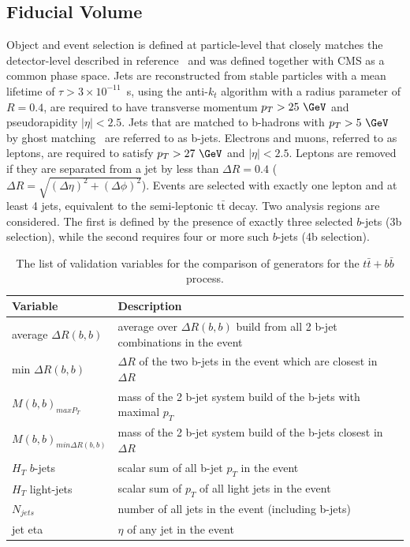 \subsection{Fiducial Volume}
Object and event selection is defined at particle-level that closely matches the detector-level described in reference~\cite{HIGG-2017-03} and was defined together with CMS as a common phase space. Jets are reconstructed from stable particles with a mean lifetime of $\tau > 3\times 10^{-11}$~s, using the anti-$k_t$ algorithm with a radius parameter of $R=0.4$, are required to have transverse momentum $p_{T}>25~\GeV$ and pseudorapidity $|\eta|< 2.5$. Jets that are matched to b-hadrons with $p_{T}>5~\GeV$ by ghost matching~\cite{Cacciari:2008gn} are referred to as b-jets. Electrons and muons, referred to as leptons, are required to satisfy $p_{T}>27~\GeV$ and $|\eta|< 2.5$. 
Leptons are removed if they are separated from a jet by less than $\Delta R=0.4$ ($\Delta R = \sqrt{(\Delta \eta )^2 + (\Delta \phi)^2}$).
Events are selected with exactly one lepton and at least 4 jets, equivalent to the semi-leptonic $\mathrm{t\bar{t}}$ decay.
Two analysis regions are considered. The first is defined by the presence of exactly three selected $b$-jets (3b selection), while the second requires four or more such $b$-jets (4b selection).


\begin{table}[]
\begin{center}
\caption{\label{tab:ttbb_varlist}
The list of validation variables for the comparison of generators for the $t\bar{t}+b\bar{b}$ process.}
\vspace{0.25cm}
{\small
\setlength\tabcolsep{1.5pt}
\begin{tabular}{l|l}
\hline\hline
Variable & Description  \\ \hline
average $\Delta R (b,b)$&    average over $\Delta R(b, b)$ build from all 2 b-jet combinations in the event           \\ 
min $\Delta R (b,b)$ &    $\Delta R$ of the two b-jets in the event which are closest in $\Delta R $          \\ 
$M (b,b)_{maxP_T}$ &      mass of the 2 b-jet system build of the b-jets with maximal $p_T$         \\ 
$M (b,b)_{min\Delta R(b,b)}$ &         mass of the 2 b-jet system build of the b-jets closest in $\Delta R $     \\ 
$H_T$  $b$-jets&           scalar sum of all b-jet $p_T$ in the event    \\ 
$H_T$ light-jets&        scalar sum of $p_T$ of all light jets in the event       \\ 
$N_{jets}$   &     number of all jets in the event (including b-jets)          \\ 
jet eta &          $\eta$ of any jet in the event     \\ 
    \hline\hline    
\end{tabular}
}
\end{center}
\end{table}




